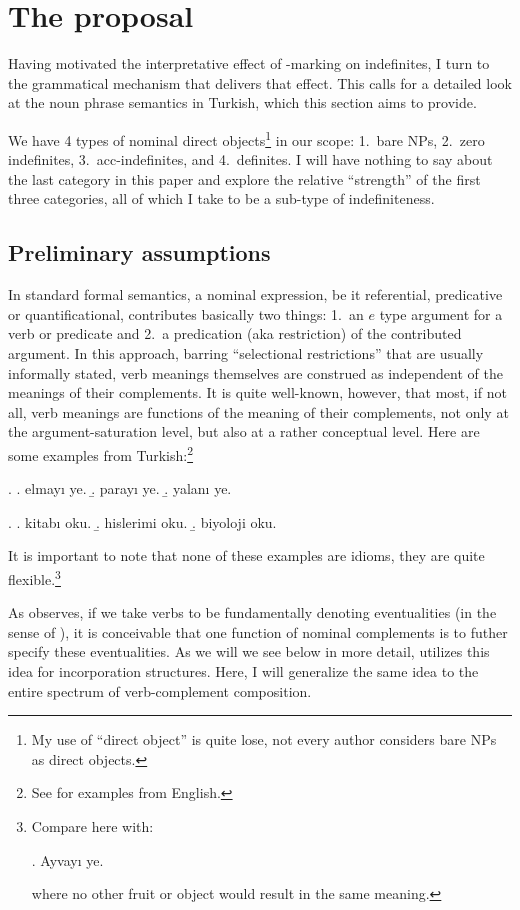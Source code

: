 \documentclass[11pt,a4paper]{article}
\begin{document}
\section{The proposal}

Having motivated the interpretative effect of \acc-marking on indefinites, I turn to the grammatical mechanism that delivers that effect. This calls for a detailed look at the noun phrase semantics in Turkish, which this section aims to provide.

We have 4 types of nominal direct objects\footnote{My use of ``direct object'' is quite lose, not every author considers bare NPs as direct objects.} in our scope: 1.\ bare NPs, 2.\ zero indefinites, 3.\ acc-indefinites, and 4.\ definites. I will have nothing to say about the last category in this paper and explore the relative ``strength'' of the first three categories, all of which I take to be a sub-type of indefiniteness. 

\subsection{Preliminary assumptions}

In standard formal semantics, a nominal expression, be it referential, predicative or quantificational, contributes basically two things: 1.\ an $e$ type argument for a verb or predicate and 2.\ a predication (aka restriction) of the contributed argument. In this approach, barring ``selectional restrictions'' that are usually informally stated, verb meanings themselves are construed as independent of the meanings of their complements. It is quite well-known, however, that most, if not all, verb meanings are functions of the meaning of their complements, not only at the argument-saturation level, but also at a rather conceptual level. Here are some examples from Turkish:\footnote{See  for examples from English.}

\ex.
\a. elmayı ye.
\b. parayı ye.
\b. yalanı ye.

\ex.
\a. kitabı oku.
\b. hislerimi oku.
\b. biyoloji oku.


It is important to note that none of these examples are idioms, they are quite flexible.\footnote{Compare here with:

\ex. Ayvayı ye.

where no other fruit or object would result in the same meaning.
}

As  observes, if we take verbs to be fundamentally denoting eventualities (in the sense of ), it is conceivable that one function of nominal complements is to futher specify these eventualities. As we will we see below in more detail,  utilizes this idea for incorporation structures. Here, I will generalize the same idea to the entire spectrum of verb-complement composition.
\end{document}
